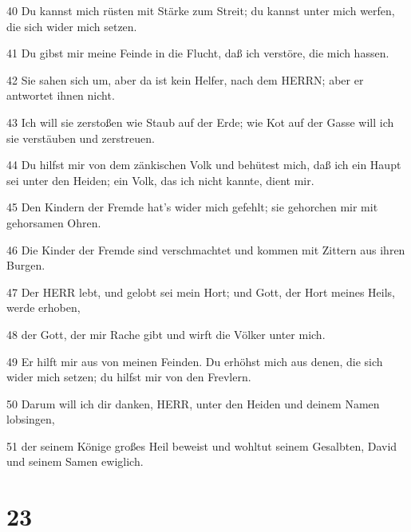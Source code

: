 \par 40 Du kannst mich rüsten mit Stärke zum Streit; du kannst unter mich werfen, die sich wider mich setzen.
\par 41 Du gibst mir meine Feinde in die Flucht, daß ich verstöre, die mich hassen.
\par 42 Sie sahen sich um, aber da ist kein Helfer, nach dem HERRN; aber er antwortet ihnen nicht.
\par 43 Ich will sie zerstoßen wie Staub auf der Erde; wie Kot auf der Gasse will ich sie verstäuben und zerstreuen.
\par 44 Du hilfst mir von dem zänkischen Volk und behütest mich, daß ich ein Haupt sei unter den Heiden; ein Volk, das ich nicht kannte, dient mir.
\par 45 Den Kindern der Fremde hat's wider mich gefehlt; sie gehorchen mir mit gehorsamen Ohren.
\par 46 Die Kinder der Fremde sind verschmachtet und kommen mit Zittern aus ihren Burgen.
\par 47 Der HERR lebt, und gelobt sei mein Hort; und Gott, der Hort meines Heils, werde erhoben,
\par 48 der Gott, der mir Rache gibt und wirft die Völker unter mich.
\par 49 Er hilft mir aus von meinen Feinden. Du erhöhst mich aus denen, die sich wider mich setzen; du hilfst mir von den Frevlern.
\par 50 Darum will ich dir danken, HERR, unter den Heiden und deinem Namen lobsingen,
\par 51 der seinem Könige großes Heil beweist und wohltut seinem Gesalbten, David und seinem Samen ewiglich.

\chapter{23}

